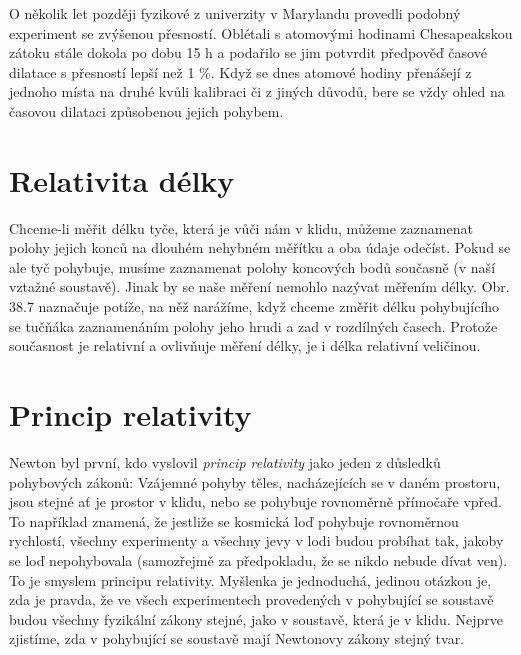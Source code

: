       O několik let později fyzikové z univerzity v Marylandu provedli podobný experiment se
      zvýšenou přesností. Oblétali s atomovými hodinami Chesapeakskou zátoku stále dokola po dobu 15
      h a podařilo se jim potvrdit předpověď časové dilatace s přesností lepší než 1 \%. Když se
      dnes atomové hodiny přenášejí z jednoho místa na druhé kvůli kalibraci či z jiných důvodů,
      bere se vždy ohled na časovou dilataci způsobenou jejich pohybem.

      

      

      
  
  \section{Relativita délky}\label{fyz:IchapXVsecII}     
    Chceme-li měřit délku tyče, která je vůči nám v klidu, můžeme zaznamenat polohy jejich konců na
    dlouhém nehybném měřítku a oba údaje odečíst. Pokud se ale tyč pohybuje, musíme zaznamenat
    polohy koncových bodů současně (v naší vztažné soustavě). Jinak by se naše měření nemohlo
    nazývat měřením délky. Obr. 38.7 naznačuje potíže, na něž narážíme, když chceme změřit délku
    pohybujícího se tučňáka zaznamenáním polohy jeho hrudi a zad v rozdílných časech. Protože
    současnost je relativní a ovlivňuje měření délky, je i délka relativní veličinou.  

  \section{Princip relativity}\label{fyz:IchapXVsecIII}     
    Newton byl první, kdo vyslovil \emph{princip relativity} jako jeden z důsledků pohybových
    zákonů: Vzájemné pohyby těles, nacházejících se v daném prostoru, jsou stejné ať je prostor v
    klidu, nebo se pohybuje rovnoměrně přímočaře vpřed. To například znamená, že jestliže se
    kosmická loď pohybuje rovnoměrnou rychlostí, všechny experimenty a všechny jevy v lodi budou
    probíhat tak, jakoby se loď nepohybovala (samozřejmě za předpokladu, že se nikdo nebude dívat
    ven). To je smyslem principu relativity. Myšlenka je jednoduchá, jedinou otázkou je, zda je
    pravda, že ve všech experimentech provedených v pohybující se soustavě budou všechny fyzikální
    zákony stejné, jako v soustavě, která je v klidu. Nejprve zjistíme, zda v pohybující se soustavě
    mají Newtonovy zákony stejný tvar.


